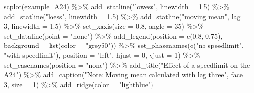 \documentclass[
  letterpaper,
  DIV=11,
  numbers=noendperiod]{scrreprt}
\newenvironment{Shaded}{\begin{snugshade}}{\end{snugshade}}
\newcommand{\AttributeTok}[1]{\textcolor[rgb]{0.40,0.45,0.13}{#1}}
\newcommand{\DecValTok}[1]{\textcolor[rgb]{0.68,0.00,0.00}{#1}}
\newcommand{\FloatTok}[1]{\textcolor[rgb]{0.68,0.00,0.00}{#1}}
\newcommand{\FunctionTok}[1]{\textcolor[rgb]{0.28,0.35,0.67}{#1}}
\newcommand{\NormalTok}[1]{\textcolor[rgb]{0.00,0.23,0.31}{#1}}
\newcommand{\SpecialCharTok}[1]{\textcolor[rgb]{0.37,0.37,0.37}{#1}}
\newcommand{\StringTok}[1]{\textcolor[rgb]{0.13,0.47,0.30}{#1}}
\begin{document}
\begin{Shaded}
\begin{Highlighting}[]
\FunctionTok{scplot}\NormalTok{(example\_A24) }\SpecialCharTok{\%\textgreater{}\%} 
  \FunctionTok{add\_statline}\NormalTok{(}\StringTok{"lowess"}\NormalTok{, }\AttributeTok{linewidth =} \FloatTok{1.5}\NormalTok{) }\SpecialCharTok{\%\textgreater{}\%}
  \FunctionTok{add\_statline}\NormalTok{(}\StringTok{"loess"}\NormalTok{, }\AttributeTok{linewidth =} \FloatTok{1.5}\NormalTok{) }\SpecialCharTok{\%\textgreater{}\%}
  \FunctionTok{add\_statline}\NormalTok{(}\StringTok{"moving mean"}\NormalTok{, }\AttributeTok{lag =} \DecValTok{3}\NormalTok{, }\AttributeTok{linewidth =} \FloatTok{1.5}\NormalTok{) }\SpecialCharTok{\%\textgreater{}\%}
  \FunctionTok{set\_xaxis}\NormalTok{(}\AttributeTok{size =} \FloatTok{0.8}\NormalTok{, }\AttributeTok{angle =} \DecValTok{35}\NormalTok{) }\SpecialCharTok{\%\textgreater{}\%}
  \FunctionTok{set\_dataline}\NormalTok{(}\AttributeTok{point =} \StringTok{"none"}\NormalTok{) }\SpecialCharTok{\%\textgreater{}\%}
  \FunctionTok{add\_legend}\NormalTok{(}\AttributeTok{position =} \FunctionTok{c}\NormalTok{(}\FloatTok{0.8}\NormalTok{, }\FloatTok{0.75}\NormalTok{), }\AttributeTok{background =} \FunctionTok{list}\NormalTok{(}\AttributeTok{color =} \StringTok{"grey50"}\NormalTok{)) }\SpecialCharTok{\%\textgreater{}\%}
  \FunctionTok{set\_phasenames}\NormalTok{(}\FunctionTok{c}\NormalTok{(}\StringTok{"no speedlimit"}\NormalTok{, }\StringTok{"with speedlimit"}\NormalTok{), }
                 \AttributeTok{position =} \StringTok{"left"}\NormalTok{, }\AttributeTok{hjust =} \DecValTok{0}\NormalTok{, }\AttributeTok{vjust =} \DecValTok{1}\NormalTok{) }\SpecialCharTok{\%\textgreater{}\%}
  \FunctionTok{set\_casenames}\NormalTok{(}\AttributeTok{position =} \StringTok{"none"}\NormalTok{) }\SpecialCharTok{\%\textgreater{}\%}
  \FunctionTok{add\_title}\NormalTok{(}\StringTok{"Effect of a speedlimit on the A24"}\NormalTok{) }\SpecialCharTok{\%\textgreater{}\%}
  \FunctionTok{add\_caption}\NormalTok{(}\StringTok{"Note: Moving mean calculated with lag three"}\NormalTok{, }\AttributeTok{face =} \DecValTok{3}\NormalTok{, }\AttributeTok{size =} \DecValTok{1}\NormalTok{) }\SpecialCharTok{\%\textgreater{}\%}
  \FunctionTok{add\_ridge}\NormalTok{(}\AttributeTok{color =} \StringTok{"lightblue"}\NormalTok{)}
\end{Highlighting}
\end{Shaded}
\end{document}
